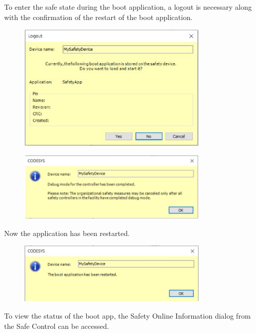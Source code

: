 \documentclass[a4paper,12pt]{article}
\begin{document}
To enter the safe state during the boot application, a logout is necessary along with the confirmation of the restart of the boot application.
\begin{figure}[H]
	\centering
	\includegraphics[width=0.8\textwidth]{e18.JPG}
\end{figure}
\begin{figure}[H]
	\centering
	\includegraphics[width=0.8\textwidth]{e19.JPG}
\end{figure}
Now the application has been restarted.
\begin{figure}[H]
	\centering
	\includegraphics[width=0.8\textwidth]{e19e20.JPG}
\end{figure}
To view the status of the boot app, the Safety Online Information dialog from the Safe Control can be accessed.
\end{document}
